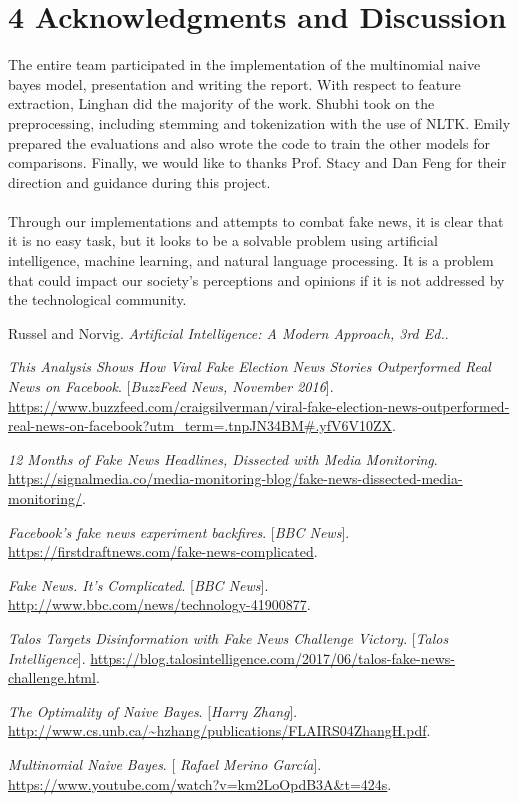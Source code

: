 \documentclass{neu_handout}
\begin{document}
\section*{4 Acknowledgments and Discussion}

The entire team participated in the implementation of the multinomial naive bayes model, presentation and writing the report. With respect to feature extraction, Linghan did the majority of the work. Shubhi took on the preprocessing, including stemming and tokenization with the use of NLTK. Emily prepared the evaluations and also wrote the code to train the other models for comparisons. Finally, we would like to thanks Prof. Stacy and Dan Feng for their direction and guidance during this project.
\\\\
Through our implementations and attempts to combat fake news, it is clear that it is no easy task, but it looks to be a solvable problem using artificial intelligence, machine learning, and natural language processing. It is a problem that could impact our society's perceptions and opinions if it is not addressed by the technological community.


\begin{thebibliography}{9}

Russel and Norvig. 
\textit{Artificial Intelligence: A Modern Approach, 3rd Ed.}. 

 
\textit{This Analysis Shows How Viral Fake Election News Stories Outperformed Real News on Facebook}.
[\textit{BuzzFeed News, November 2016}].
\url{https://www.buzzfeed.com/craigsilverman/viral-fake-election-news-outperformed-real-news-on-facebook?utm_term=.tnpJN34BM#.yfV6V10ZX}.
 

\textit{12 Months of Fake News Headlines, Dissected with Media Monitoring}. 
 \url{https://signalmedia.co/media-monitoring-blog/fake-news-dissected-media-monitoring/}.

\textit{Facebook's fake news experiment backfires}.
[\textit{BBC News}]. 
 \url{https://firstdraftnews.com/fake-news-complicated}.
 
 
\textit{Fake News. It's Complicated}.
[\textit{BBC News}]. 
 \url{http://www.bbc.com/news/technology-41900877}.
 
\textit{Talos Targets Disinformation with Fake News Challenge Victory}.
[\textit{Talos Intelligence}]. 
 \url{https://blog.talosintelligence.com/2017/06/talos-fake-news-challenge.html}.
 
\textit{The Optimality of Naive Bayes}.
[\textit{Harry Zhang}]. 
 \url{http://www.cs.unb.ca/~hzhang/publications/FLAIRS04ZhangH.pdf}.
 
 
\textit{Multinomial Naive Bayes}.
[\textit{
Rafael Merino García}]. 
 \url{https://www.youtube.com/watch?v=km2LoOpdB3A&t=424s}.

\end{thebibliography}
\end{document}
